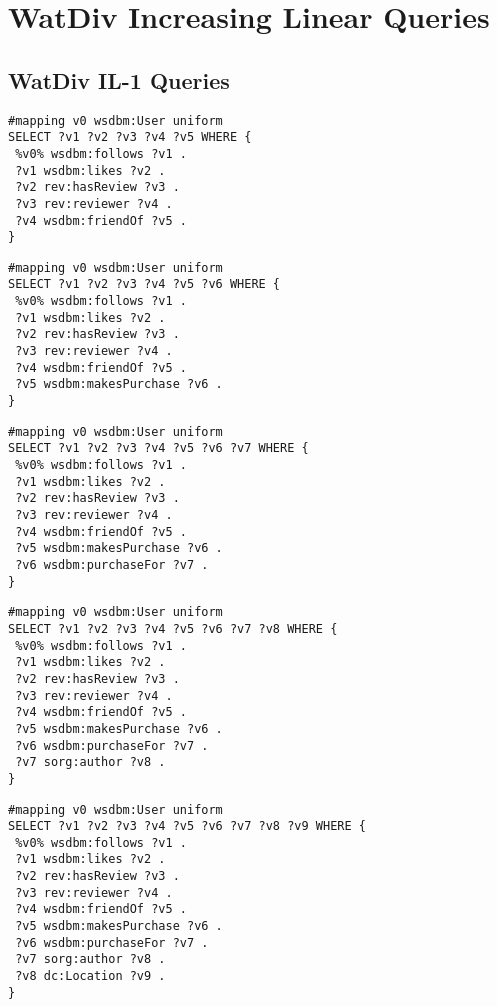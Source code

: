 \section{WatDiv Increasing Linear Queries} 

\subsection{WatDiv IL-1 Queries} 

\begin{lstlisting}[caption={IL-1-5},label=query:IL-1-5]
#mapping v0 wsdbm:User uniform
SELECT ?v1 ?v2 ?v3 ?v4 ?v5 WHERE {
 %v0% wsdbm:follows ?v1 .
 ?v1 wsdbm:likes ?v2 .
 ?v2 rev:hasReview ?v3 .
 ?v3 rev:reviewer ?v4 .
 ?v4 wsdbm:friendOf ?v5 .
}
\end{lstlisting}

\begin{lstlisting}[caption={IL-1-7},label=query:IL-1-6]
#mapping v0 wsdbm:User uniform
SELECT ?v1 ?v2 ?v3 ?v4 ?v5 ?v6 WHERE {
 %v0% wsdbm:follows ?v1 .
 ?v1 wsdbm:likes ?v2 .
 ?v2 rev:hasReview ?v3 .
 ?v3 rev:reviewer ?v4 .
 ?v4 wsdbm:friendOf ?v5 .
 ?v5 wsdbm:makesPurchase ?v6 .
}
\end{lstlisting}

\begin{lstlisting}[caption={IL-1-7},label=query:IL-1-7]
#mapping v0 wsdbm:User uniform
SELECT ?v1 ?v2 ?v3 ?v4 ?v5 ?v6 ?v7 WHERE {
 %v0% wsdbm:follows ?v1 .
 ?v1 wsdbm:likes ?v2 .
 ?v2 rev:hasReview ?v3 .
 ?v3 rev:reviewer ?v4 .
 ?v4 wsdbm:friendOf ?v5 .
 ?v5 wsdbm:makesPurchase ?v6 .
 ?v6 wsdbm:purchaseFor ?v7 .
}
\end{lstlisting}

\begin{lstlisting}[caption={IL-1-8},label=query:IL-1-8]
#mapping v0 wsdbm:User uniform
SELECT ?v1 ?v2 ?v3 ?v4 ?v5 ?v6 ?v7 ?v8 WHERE {
 %v0% wsdbm:follows ?v1 .
 ?v1 wsdbm:likes ?v2 .
 ?v2 rev:hasReview ?v3 .
 ?v3 rev:reviewer ?v4 .
 ?v4 wsdbm:friendOf ?v5 .
 ?v5 wsdbm:makesPurchase ?v6 .
 ?v6 wsdbm:purchaseFor ?v7 .
 ?v7 sorg:author ?v8 .
}
\end{lstlisting}

\begin{lstlisting}[caption={IL-1-9},label=query:IL-1-9]
#mapping v0 wsdbm:User uniform
SELECT ?v1 ?v2 ?v3 ?v4 ?v5 ?v6 ?v7 ?v8 ?v9 WHERE {
 %v0% wsdbm:follows ?v1 .
 ?v1 wsdbm:likes ?v2 .
 ?v2 rev:hasReview ?v3 .
 ?v3 rev:reviewer ?v4 .
 ?v4 wsdbm:friendOf ?v5 .
 ?v5 wsdbm:makesPurchase ?v6 .
 ?v6 wsdbm:purchaseFor ?v7 .
 ?v7 sorg:author ?v8 .
 ?v8 dc:Location ?v9 .
}
\end{lstlisting}

